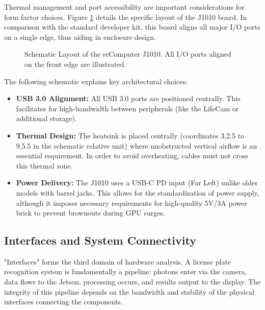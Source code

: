 Thermal management and port accessibility are important considerations for form factor choices. Figure \ref{fig:j1010_schematic} details the specific layout of the J1010 board. In comparison with the standard developer kit, this board aligns all major I/O ports on a single edge, thus aiding in enclosure design.

\begin{figure}[h!]
	\centering
	
	\caption{Schematic Layout of the reComputer J1010. All I/O ports aligned on the front edge are illustrated.}
	\label{fig:j1010_schematic}
\end{figure}

The following schematic explains key architectural choices:
\begin{itemize}
	\item \textbf{USB 3.0 Alignment:} All USB 3.0 ports are positioned centrally. This facilitates for high-bandwidth between peripherals (like the LifeCam or additional storage).
	\item \textbf{Thermal Design:} The heatsink is placed centrally (coordinates 3,2.5 to 9,5.5 in the schematic relative unit) where unobstructed vertical airflow is an essential requirement. In order to avoid overheating, cables must not cross this thermal zone. 
	\item \textbf{Power Delivery:} The J1010 uses a USB-C PD input (Far Left) unlike older models with barrel jacks. This allows for the standardization of power supply, although it imposes necessary requirements for high-quality 5V/3A power brick to prevent brownouts during GPU surges.
\end{itemize}

\newpage

\subsection{Interfaces and System Connectivity}

 "Interfaces" forms the third domain of hardware analysis. A license plate recognition system is fundamentally a pipeline: photons enter via the camera, data flows to the Jetson, processing occurs, and results output to the display. The integrity of this pipeline depends on the bandwidth and stability of the physical interfaces connecting the components.

